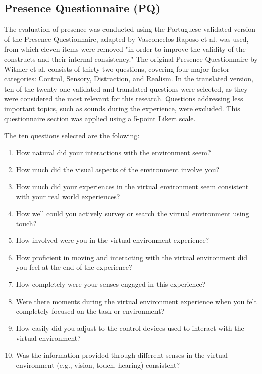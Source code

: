 \subsection{Presence Questionnaire (\gls{PQ})}

The evaluation of presence was conducted using the Portuguese validated version of the Presence Questionnaire, adapted by Vasconcelos-Raposo et al. \cite{Vasconcelos-Raposo03102021} was used, from which eleven items were removed 
"in order to improve the validity of the constructs and their internal consistency."
The original Presence Questionnaire by Witmer et al. \cite{10.1162/105474698565686} consists of thirty-two questions, covering four major factor categories: Control, Sensory, Distraction, and Realism.
In the translated version, ten of the twenty-one validated and translated questions were selected, as they were considered the most relevant for this research. 
Questions addressing less important topics, such as sounds during the experience, were excluded. This questionnaire section was applied using a 5-point Likert scale.

The ten questions selected are the folowing:

\begin{enumerate}[label=Q\arabic* --]
    \item How natural did your interactions with the environment seem?
    \item How much did the visual aspects of the environment involve you?
    \item How much did your experiences in the virtual environment seem consistent with your real world experiences?
    \item How well could you actively survey or search the virtual environment using touch?
    \item How involved were you in the virtual environment experience?
    \item How proficient in moving and interacting with the virtual environment did you feel at the end of the experience?
    \item How completely were your senses engaged in this experience?
    \item Were there moments during the virtual environment experience when you felt completely focused on the task or environment?
    \item How easily did you adjust to the control devices used to interact with the virtual environment?
    \item Was the information provided through different senses in the virtual environment (e.g., vision, touch, hearing) consistent?
\end{enumerate}


